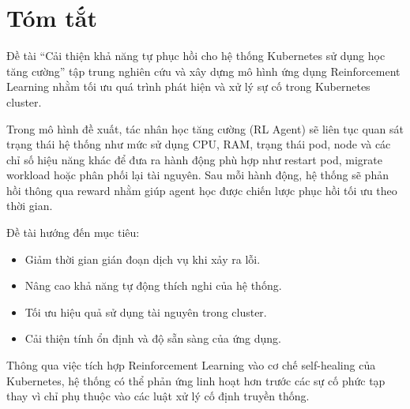\chapter*{Tóm tắt}
Đề tài “Cải thiện khả năng tự phục hồi cho hệ thống Kubernetes sử dụng học tăng cường” tập trung nghiên cứu và xây dựng mô hình ứng dụng Reinforcement Learning nhằm tối ưu quá trình phát hiện và xử lý sự cố trong Kubernetes cluster.

Trong mô hình đề xuất, tác nhân học tăng cường (RL Agent) sẽ liên tục quan sát trạng thái hệ thống như mức sử dụng CPU, RAM, trạng thái pod, node và các chỉ số hiệu năng khác để đưa ra hành động phù hợp như restart pod, migrate workload hoặc phân phối lại tài nguyên. Sau mỗi hành động, hệ thống sẽ phản hồi thông qua reward nhằm giúp agent học được chiến lược phục hồi tối ưu theo thời gian.

Đề tài hướng đến mục tiêu:
\begin{itemize}
    \item Giảm thời gian gián đoạn dịch vụ khi xảy ra lỗi.
    \item Nâng cao khả năng tự động thích nghi của hệ thống.
    \item Tối ưu hiệu quả sử dụng tài nguyên trong cluster.
    \item Cải thiện tính ổn định và độ sẵn sàng của ứng dụng.
\end{itemize}
Thông qua việc tích hợp Reinforcement Learning vào cơ chế self-healing của Kubernetes, hệ thống có thể phản ứng linh hoạt hơn trước các sự cố phức tạp thay vì chỉ phụ thuộc vào các luật xử lý cố định truyền thống.